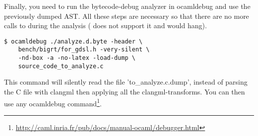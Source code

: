 Finally, you need to run the bytecode-debug analyzer in ocamldebug
and use the previously dumped AST.
All these steps are necessary so that there are no more calls to
 during the analysis
( does not support it and would hang).

\begin{verbatim}
$ ocamldebug ./analyze.d.byte -header \
    bench/bigrt/for_gdsl.h -very-silent \
    -nd-box -a -no-latex -load-dump \
    source_code_to_analyze.c
\end{verbatim}

This command will silently read the file 'to\_analyze.c.dump',
instead of parsing the C file with clangml then applying all the
clangml-transforms.
You can then use any ocamldebug command\footnote{
\url{http://caml.inria.fr/pub/docs/manual-ocaml/debugger.html}}.
